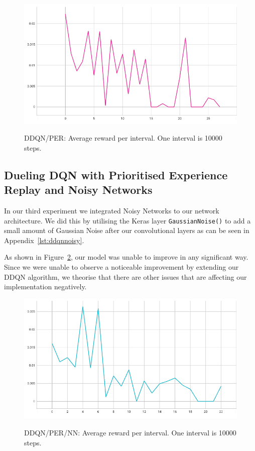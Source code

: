 \documentclass[12pt,a4paper]{article}
\begin{document}
    \begin{figure}[H]
        \caption[DDQN/PER: Average reward per interval.]{DDQN/PER: Average reward per interval. One interval is 10000 steps.}
        \centering
        \includegraphics[scale=0.5]{interval_score_ddqn_per}
        \label{fig:ddqn_per_interval_score}
    \end{figure}

    \subsection{Dueling DQN with Prioritised Experience Replay and Noisy Networks}\label{subsec:dueling-dqn-with-prioritised-experience-replay-and-noisy-networks}
    In our third experiment we integrated Noisy Networks to our network architecture.
    We did this by utilising the Keras layer \texttt{GaussianNoise()} to add a small amount of Gaussian Noise after our convolutional layers as can be seen in Appendix~\ref{lst:ddqnnoisy}.

    As shown in Figure~\ref{fig:ddqn_noisy_interval_score}, our model was unable to improve in any significant way.
    Since we were unable to observe a noticeable improvement by extending our DDQN algorithm, we theorise that
    there are other issues that are affecting our implementation negatively.
    \begin{figure}[H]
        \caption[DDQN/PER/NN: Average reward per interval.]{DDQN/PER/NN: Average reward per interval. One interval is 10000 steps.}
        \centering
        \includegraphics[scale=0.5]{interval_score_ddqn_noisy}
        \label{fig:ddqn_noisy_interval_score}
    \end{figure}
\end{document}
